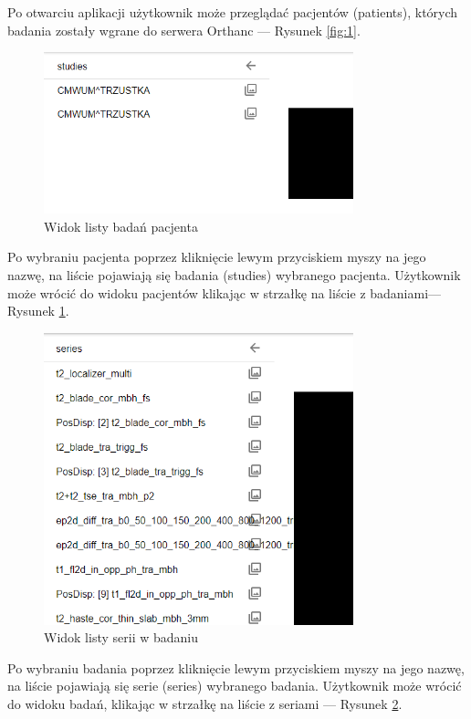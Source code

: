 \documentclass[a4paper,11pt,twoside,openright]{report}
\theoremstyle{definition}
\begin{document}
Po otwarciu aplikacji użytkownik może przeglądać pacjentów (patients), których badania zostały wgrane do serwera Orthanc --- Rysunek \ref{fig:1}.

\pagebreak


\begin{figure}[h!]
	\center
	\includegraphics[width=0.8\textwidth]{2}
	\caption{Widok listy badań pacjenta}
    	\label{fig:2}
\end{figure}

Po wybraniu pacjenta poprzez kliknięcie lewym przyciskiem myszy na jego nazwę, na liście pojawiają się badania (studies) wybranego pacjenta. Użytkownik może wrócić do widoku pacjentów klikając w strzałkę na liście z badaniami--- Rysunek \ref{fig:2}.

\pagebreak

\begin{figure}[h!]
	\center
	\includegraphics[width=0.8\textwidth]{3}
	\caption{Widok listy serii w badaniu}
    	\label{fig:3}
\end{figure}

Po wybraniu badania poprzez kliknięcie lewym przyciskiem myszy na jego nazwę, na liście pojawiają się serie (series) wybranego badania. Użytkownik może wrócić do widoku badań, klikając w strzałkę na liście z seriami --- Rysunek \ref{fig:3}.
\end{document}
